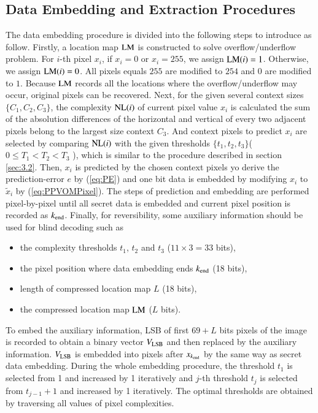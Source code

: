 \documentclass[review,3p,10pt,sort&compress]{elsarticle}
\begin{document}
\subsection{Data Embedding and Extraction Procedures}\label{sec:3.3}
The data embedding procedure is divided into the following steps to introduce as follow. Firstly, a location map ${\rm LM}$ is constructed to solve overflow/underflow problem. For $i$-th pixel $x_i$, if $x_i = 0$ or $x_i = 255$, we assign ${\rm LM}(i) = 1$. Otherwise, we assign ${\rm LM}(i) = 0$. All pixels equals $255$ are modified to $254$ and $0$ are modified to $1$. Because ${\rm LM}$ records all the locations where the overflow/underflow may occur, original pixels can be recovered. Next, for the given several context sizes $\{C_1, C_2, C_3\}$, the complexity ${\rm NL}(i)$ of current pixel value $x_i$ is calculated the sum of the absolution differences of the horizontal and vertical of every two adjacent pixels belong to the largest size context $C_3$. And context pixels to predict $x_i$ are selected by comparing ${\rm NL}(i)$ with the given thresholds $\{t_1, t_2, t_3\}$($0 \leq T_1 < T_2 < T_3$ ), which is similar to the procedure described in section \ref{sec:3.2}. Then, $x_i$ is predicted by the chosen context pixels yo derive the prediction-error $e$ by (\ref{eq:PE}) and one bit data is embedded by modifying $x_i$ to $\tilde{x}_i$ by (\ref{eq:PPVOMPixel}). The steps of prediction and embedding are performed pixel-by-pixel until all secret data is embedded and current pixel position is recorded as $k_{\rm end}$. Finally, for reversibility, some auxiliary information should be used for blind decoding such as
\begin{itemize}
  \item the complexity thresholds $t_1$, $t_2$ and $t_3$ ($11 \times 3 = 33$ bits),
  \item the pixel position where data embedding ends $k_{\rm end}$ (18 bits),
  \item length of compressed location map $L$ (18 bits),
  \item the compressed location map ${\rm LM}$ ($L$ bits).
\end{itemize}
To embed the auxiliary information, LSB of first $69 + L$ bits pixels of the image is recorded to obtain a binary vector $V_{\rm LSB}$ and then replaced by the auxiliary information. $V_{\rm LSB}$ is embedded into pixels after $x_{k_{\rm end}}$ by the same way as secret data embedding. During the whole embedding procedure, the threshold $t_1$ is selected from 1 and increased by 1 iteratively and $j$-th threshold $t_j$ is selected from $t_{j-1} + 1$ and increased by 1 iteratively. The optimal thresholds are obtained by traversing all values of pixel complexities.
\end{document}

